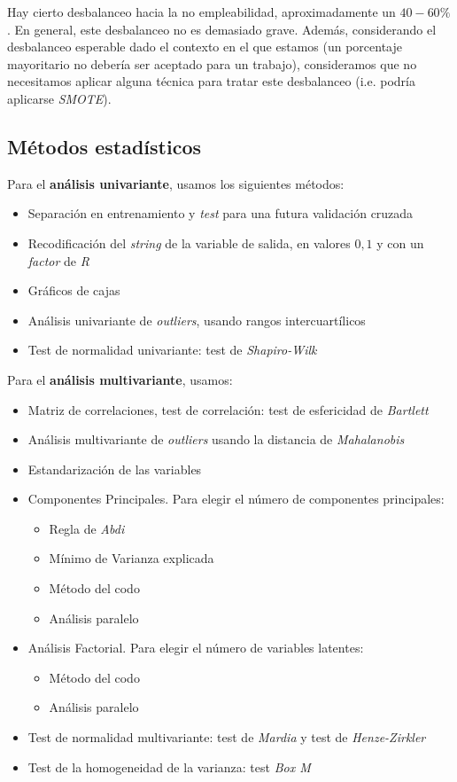 Hay cierto desbalanceo hacia la no empleabilidad, aproximadamente un $40-60\%$. En general, este desbalanceo no es demasiado grave. Además, considerando el desbalanceo esperable dado el contexto en el que estamos (un porcentaje mayoritario no debería ser aceptado para un trabajo), consideramos que no necesitamos aplicar alguna técnica para tratar este desbalanceo (i.e. podría aplicarse \textit{SMOTE}).

\subsection{Métodos estadísticos}

Para el \textbf{análisis univariante}, usamos los siguientes métodos:

\begin{itemize}
    \item Separación en entrenamiento y \textit{test} para una futura validación cruzada
    \item Recodificación del \textit{string} de la variable de salida, en valores $0, 1$ y con un \textit{factor} de \textit{R}
    \item Gráficos de cajas
    \item Análisis univariante de \textit{outliers}, usando rangos intercuartílicos
    \item Test de normalidad univariante: test de \textit{Shapiro-Wilk}
\end{itemize}

Para el \textbf{análisis multivariante}, usamos:


\begin{itemize}
    \item Matriz de correlaciones, test de correlación: test de esfericidad de \textit{Bartlett}
    \item Análisis multivariante de \textit{outliers} usando la distancia de \textit{Mahalanobis}
    \item Estandarización de las variables
    \item Componentes Principales. Para elegir el número de componentes principales:
        \begin{itemize}
            \item Regla de \textit{Abdi}
            \item Mínimo de Varianza explicada
            \item Método del codo
            \item Análisis paralelo
        \end{itemize}
    \item Análisis Factorial. Para elegir el número de variables latentes:
        \begin{itemize}
            \item Método del codo
            \item Análisis paralelo
        \end{itemize}
    \item Test de normalidad multivariante: test de \textit{Mardia} y test de \textit{Henze-Zirkler}
    \item Test de la homogeneidad de la varianza: test \textit{Box M}
\end{itemize}

